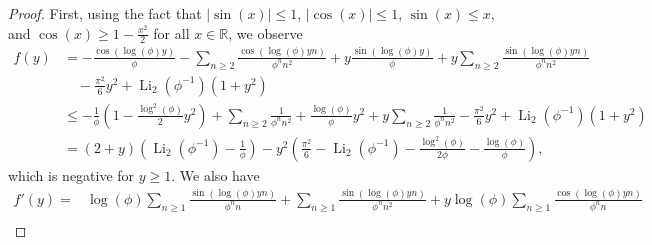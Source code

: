 \documentclass[11pt,reqno]{amsart}
\theoremstyle{remark}
\numberwithin{equation}{section}
\def\Li{\operatorname{Li}}
\def\Li{\operatorname{Li}}
\begin{document}
\begin{proof}
First, using the fact that $|\sin(x)|\leq 1$, $|\cos(x)|\leq 1$, $\sin(x) \leq x$, and $\cos(x) \geq 1-\frac{x^2}{2}$  for all $x \in \mathbb{R}$, we observe
\begin{align*}
	f(y)%
	&= -\frac{\cos(\log(\phi)y)}{\phi} -  \sum_{n \ge 2} \frac{ \cos \left( \log(\phi) y n\right)}{\phi^n n^2} +y \frac{\sin(\log(\phi)y)}{\phi}+ y \sum_{n \ge 2} \frac{ \sin \left( \log(\phi) y n \right)}{\phi^n n^2}\\
	&\quad -\frac{\pi^2}{6} y^2 + \Li_2 (\phi^{-1})(1+y^2) \\
	&\leq  -\frac1{\phi}\left(1-\frac{\log^2(\phi)}{2} y^2\right) +  \sum_{n \ge 2} \frac{1}{\phi^n n^2} +\frac{\log(\phi)}{\phi}y^2 + y \sum_{n \ge 2} \frac{1}{\phi^n n^2}  -\frac{\pi^2}{6} y^2 + \Li_2 (\phi^{-1})(1+y^2) \\
	&= (2+y) \left( \Li_2(\phi^{-1}) - \frac1{\phi}  \right) -y^2 \left( \frac{\pi^2}{6}- \Li_2 (\phi^{-1}) - \frac{\log^2(\phi)}{2\phi} -\frac{\log(\phi)}{\phi} \right),
\end{align*}
which is negative for  $y \geq 1$.
We also have
\begin{align*}
	f'(y) =& \log(\phi) \sum_{n \ge 1} \frac{ \sin \left( \log(\phi) y n\right)}{\phi^n n} +  \sum_{n \ge 1} \frac{ \sin \left( \log(\phi) y n \right)}{\phi^n n^2} + y \log(\phi) \sum_{n \ge 1} \frac{ \cos \left( \log(\phi) y n \right)}{\phi^n n}\\

\end{align*}
\end{proof}
\end{document}
